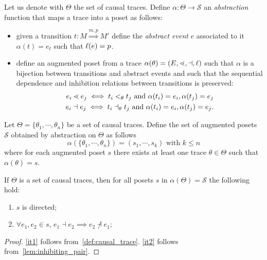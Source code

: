 \begin{definition}
  \label{def:abstraction}
  Let us denote with $\Theta$ the set of causal traces.
  Define $\alpha:\Theta\to\mathcal{S}$ an \emph{abstraction} function that maps a trace into a poset as follows:
    \begin{itemize}
    \item given a transition $t:M\overset{m,p}{\Rightarrow} M'$ define the \emph{abstract event} $e$ associated to it
      $\alpha(t) = e_t$ such that $\ell(e) = p$.
    \item define an augmented poset from a trace $\alpha(\theta) = (E,\lessdot,\dashv,\ell)$ such that $\alpha$ is a bijection between transitions and abstract events and such that the sequential dependence and inhibition relations between transitions is preserved:
      \begin{align*}
        e_i \lessdot e_j \iff t_i <_{\theta} t_j \text{ and } \alpha(t_i)=e_i, \alpha(t_j)=e_j\\
        e_i \dashv e_j \iff t_i \dashv_{\theta} t_j \text{ and } \alpha(t_i)=e_i, \alpha(t_j)=e_j.
      \end{align*}
    \end{itemize}
    Let $\Theta = \{\theta_1,\cdots,\theta_n\}$ be a set of causal traces.
    Define the set of augmented posets $\mathcal{S}$ obtained by abstraction on $\Theta$ as follows
    \[
    \alpha(\{\theta_1,\cdots,\theta_n\}) = (s_1,\cdots, s_k)\text{ with }k\leq n
    \]
    where for each augmented poset $s$ there exists at least one trace $\theta\in\Theta$ such that $\alpha(\theta) = s$.
\end{definition}

\begin{property}
  If $\Theta$ is a set of causal traces, then for all posets $s$ in $\alpha(\Theta)=\mathcal{S}$ the following hold:
  \begin{enumerate}
  \item
    \label{it1}
    $s$ is directed;
  \item
    \label{it2}
    $\forall e_1,e_2\in s$, $e_1\dashv e_2\implies e_2 \not\dashv e_1$;
  \end{enumerate}
\end{property}
\begin{proof}
  \autoref{it1} follows from~\autoref{def:causal_trace}. \autoref{it2} follows from~\autoref{lem:inhibiting_pair}.
\end{proof}


